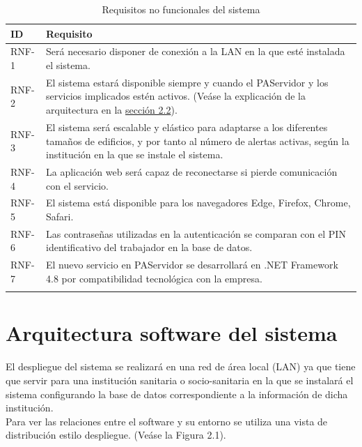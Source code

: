\begin{longtable}{|p{}|p{}|}
	\hline
	\textbf{ID} & \textbf{Requisito} \\
	\hline
	RNF-1 	& 	Será necesario disponer de conexión a la LAN en la que esté instalada el sistema. \\
	\hline
	RNF-2	&	El sistema estará disponible siempre y cuando el PAServidor y los servicios implicados estén activos. (Veáse la explicación de la arquitectura en la \hyperref[section-arquitectura]{sección 2.2}).	\\
	\hline
	RNF-3	&	El sistema será escalable y elástico para adaptarse a los diferentes tamaños de edificios, y por tanto al número de alertas activas, según la institución en la que se instale el sistema.\\
	\hline
	RNF-4	&	La aplicación web será capaz de reconectarse si pierde comunicación con el servicio.\\
	\hline
	RNF-5	&	El sistema está disponible para los navegadores Edge, Firefox, Chrome, Safari.\\
	\hline
	RNF-6	&	Las contraseñas utilizadas en la autenticación se comparan con el PIN identificativo del trabajador en la base de datos. \\
	\hline
	RNF-7	&	El nuevo servicio en PAServidor se desarrollará en .NET Framework 4.8 por compatibilidad tecnológica con la empresa. \\
	\hline
\caption{Requisitos no funcionales del sistema}
\label{tab:RNF}
\end{longtable}


\section{Arquitectura software del sistema}
\label{section-arquitectura}

El despliegue del sistema se realizará en una red de área local (LAN) ya que tiene que servir para una institución sanitaria o socio-sanitaria en la que se instalará el sistema configurando la base de datos correspondiente a la información de dicha institución.\\

Para ver las relaciones entre el software y su entorno se utiliza una vista de distribución estilo despliegue. (Veáse la Figura 2.1). \\

